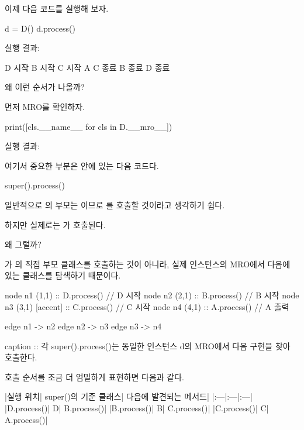 이제 다음 코드를 실행해 보자.

\begin{dhkcode}
d = D()
d.process()
\end{dhkcode}

실행 결과:

\begin{dhkzsh}
D 시작
B 시작
C 시작
A
C 종료
B 종료
D 종료
\end{dhkzsh}

왜 이런 순서가 나올까?

먼저 MRO를 확인하자.

\begin{dhkcode}
print([cls.__name__ for cls in D.__mro__])
\end{dhkcode}

실행 결과:

\begin{dhkzsh}
['D', 'B', 'C', 'A', 'object']
\end{dhkzsh}

여기서 중요한 부분은  안에 있는 다음 코드다.

\begin{dhkcode}
super().process()
\end{dhkcode}

일반적으로 의 부모는 이므로 를 호출할 것이라고 생각하기 쉽다.

하지만 실제로는 가 호출된다.

왜 그럴까?

가 의 직접 부모 클래스를 호출하는 것이 아니라, 실제  인스턴스의 MRO에서  다음에 있는 클래스를 탐색하기 때문이다.

\begin{dhkgraph}[uniform]
node n1 (1,1) :: D.process() // D 시작
node n2 (2,1) :: B.process() // B 시작
node n3 (3,1) [accent] :: C.process() // C 시작
node n4 (4,1) :: A.process() // A 출력

edge n1 -> n2
edge n2 -> n3
edge n3 -> n4

caption :: 각 super().process()는 동일한 인스턴스 d의 MRO에서 다음 구현을 찾아 호출한다.
\end{dhkgraph}

호출 순서를 조금 더 엄밀하게 표현하면 다음과 같다.

\begin{dhktable}
|실행 위치|	super()의 기준 클래스|	다음에 발견되는 메서드|
|:---|:---|:---|
|D.process()|	D|	B.process()|
|B.process()|	B|	C.process()|
|C.process()|	C|	A.process()|
\end{dhktable}

